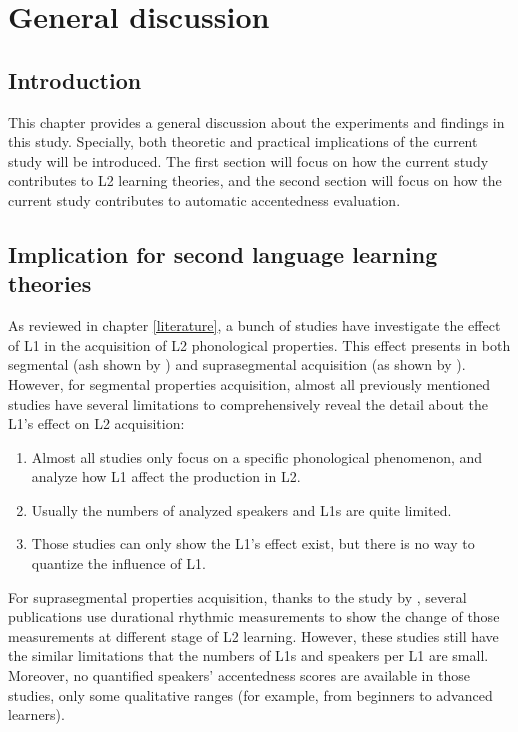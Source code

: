 \chapter{General discussion}
\label{discussion}

\section{Introduction}

This chapter provides a general discussion about the experiments and findings in this study. Specially, both theoretic and practical implications of the current study will be introduced. The first section will focus on how the current study contributes to L2 learning theories, and the second section will focus on how the current study contributes to automatic accentedness evaluation.

\section{Implication for second language learning theories}

As reviewed in chapter \ref{literature}, a bunch of studies have investigate the effect of L1 in the acquisition of L2 phonological properties. This effect presents in both segmental (ash shown by \cite{strange1992learning, flege1987production, chang2008phonetic, munro1993productions, derakhshan2015interference}) and suprasegmental acquisition (as shown by \cite{mennen2004bi, stockmal2005measures, white2007calibrating, lin2008interlanguage, li2014l2, ordin2015acquisition}). However, for segmental properties acquisition, almost all previously mentioned studies have several limitations to comprehensively reveal the detail about the L1's effect on L2 acquisition:

\begin{enumerate}
\item Almost all studies only focus on a specific phonological phenomenon, and analyze how L1 affect the production in L2.
\item Usually the numbers of analyzed speakers and L1s are quite limited.
\item Those studies can only show the L1's effect exist, but there is no way to quantize the influence of L1.
\end{enumerate}

For suprasegmental properties acquisition, thanks to the study by \cite{ramus1999correlates,grabe2002durational}, several publications use durational rhythmic measurements to show the change of those measurements at different stage of L2 learning. However, these studies still have the similar limitations that the numbers of L1s and speakers per L1 are small. Moreover, no quantified speakers' accentedness scores are available in those studies, only some qualitative ranges (for example, from beginners to advanced learners).

